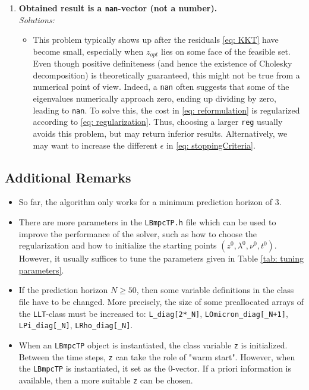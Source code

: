 \documentclass[letter]{article}
\begin{document}
\begin{sffamily}
\begin{enumerate}
	\item \textbf{Obtained result is a \texttt{nan}-vector (not a number).} \\
		\emph{Solutions:}
		\begin{itemize}
			\item This problem typically shows up after the residuals \eqref{eq: KKT} have become small, especially when $z_{opt}$ lies on some face of the feasible set. Even though positive definiteness (and hence the existence of Cholesky decomposition) is theoretically guaranteed, this might not be true from a numerical point of view. Indeed, a \texttt{nan} often suggests that some of the eigenvalues numerically approach zero, ending up dividing by zero, leading to \texttt{nan}. To solve this, the cost in \eqref{eq: reformulation} is regularized according to \eqref{eq: regularization}. Thus, choosing a larger \texttt{reg} usually avoids this problem, but may return inferior results. Alternatively, we may want to increase the different $\epsilon$ in \eqref{eq: stoppingCriteria}.
		\end{itemize}
\end{enumerate}

\subsection{Additional Remarks}
\begin{itemize}
	\item So far, the algorithm only works for a minimum prediction horizon of $3$.
	\item There are more parameters in the \texttt{LBmpcTP.h} file which can be used to improve the performance of the solver, such as how to choose the regularization and how to initialize the starting points $(z^0,\lambda^0,\nu^0,t^0)$. However, it usually suffices to tune  the parameters given in Table \eqref{tab: tuning parameters}.
	\item If the prediction horizon $N\geq50$, then some variable definitions in the class file have to be changed. More precisely, the size of some preallocated arrays of the \texttt{LLT}-class must be increased to: \texttt{L\_diag[2*\_N]}, \texttt{LOmicron\_diag[\_N+1]}, \texttt{LPi\_diag[\_N]}, \texttt{LRho\_diag[\_N]}.
	
	\item When an \texttt{LBmpcTP} object is instantiated, the class variable \texttt{z} is initialized. Between the time steps, \texttt{z} can take  the role of "warm start". However, when the \texttt{LBmpcTP} is instantiated, it set as the $0$-vector. If a priori information is available, then a more suitable \texttt{z} can be chosen.
\end{itemize}




\end{sffamily}
\end{document}
